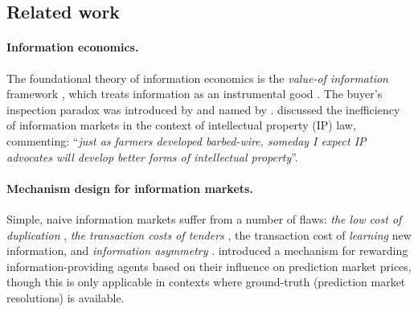 
\subsection{Related work}
\label{infonomy:sec:related}


\paragraph{Information economics.} The foundational theory of information economics is the \emph{value-of information} framework , which treats information as an instrumental good . The buyer's inspection paradox was introduced by  and named by .  discussed the inefficiency of information markets in the context of intellectual property (IP) law, commenting: ``\emph{just as farmers developed barbed-wire, someday I expect IP advocates will develop better forms of intellectual property}''.

\paragraph{Mechanism design for information markets.} Simple, naive information markets suffer from a number of flaws: \emph{the low cost of duplication} , \emph{the transaction costs of tenders} , the transaction cost of \emph{learning} new information, and \emph{information asymmetry} .  introduced a mechanism for rewarding information-providing agents based on their influence on prediction market prices, though this is only applicable in contexts where ground-truth (prediction market resolutions) is available.



